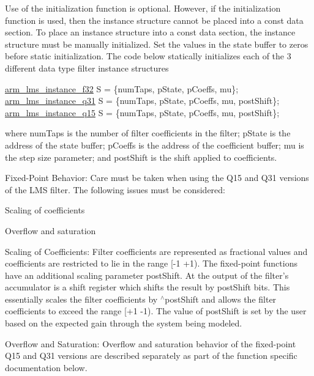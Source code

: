 \begin{DoxyParagraph}{}
Use of the initialization function is optional. However, if the initialization function is used, then the instance structure cannot be placed into a const data section. To place an instance structure into a const data section, the instance structure must be manually initialized. Set the values in the state buffer to zeros before static initialization. The code below statically initializes each of the 3 different data type filter instance structures 
\begin{DoxyPre}   
    \hyperlink{structarm__lms__instance__f32}{arm\_lms\_instance\_f32} S = \{numTaps, pState, pCoeffs, mu\};   
    \hyperlink{structarm__lms__instance__q31}{arm\_lms\_instance\_q31} S = \{numTaps, pState, pCoeffs, mu, postShift\};   
    \hyperlink{structarm__lms__instance__q15}{arm\_lms\_instance\_q15} S = \{numTaps, pState, pCoeffs, mu, postShift\};   
 \end{DoxyPre}
 where {\ttfamily num\-Taps} is the number of filter coefficients in the filter; {\ttfamily p\-State} is the address of the state buffer; {\ttfamily p\-Coeffs} is the address of the coefficient buffer; {\ttfamily mu} is the step size parameter; and {\ttfamily post\-Shift} is the shift applied to coefficients.
\end{DoxyParagraph}
\begin{DoxyParagraph}{Fixed-\/\-Point Behavior\-: }
Care must be taken when using the Q15 and Q31 versions of the L\-M\-S filter. The following issues must be considered\-:
\begin{DoxyItemize}
\item Scaling of coefficients
\item Overflow and saturation
\end{DoxyItemize}
\end{DoxyParagraph}
\begin{DoxyParagraph}{Scaling of Coefficients\-: }
Filter coefficients are represented as fractional values and coefficients are restricted to lie in the range {\ttfamily \mbox{[}-\/1 +1)}. The fixed-\/point functions have an additional scaling parameter {\ttfamily post\-Shift}. At the output of the filter's accumulator is a shift register which shifts the result by {\ttfamily post\-Shift} bits. This essentially scales the filter coefficients by {$^\wedge$post\-Shift} and allows the filter coefficients to exceed the range {\ttfamily \mbox{[}+1 -\/1)}. The value of {\ttfamily post\-Shift} is set by the user based on the expected gain through the system being modeled.
\end{DoxyParagraph}
\begin{DoxyParagraph}{Overflow and Saturation\-: }
Overflow and saturation behavior of the fixed-\/point Q15 and Q31 versions are described separately as part of the function specific documentation below. 
\end{DoxyParagraph}


